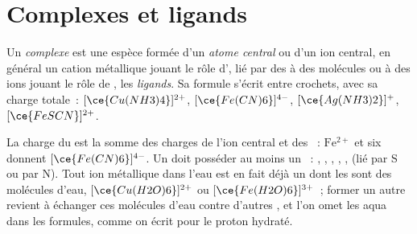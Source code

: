\section{Complexes et ligands}

\begin{definition}\label{def:b1:complexation:complex}
Un \emph{complexe} est une espèce formée d'un \emph{atome
central} ou d'un ion central, en général un cation
métallique jouant le rôle d', lié par des 
à des molécules ou à des ions jouant le rôle de , les
\emph{ligands}. Sa formule s'écrit entre crochets, avec sa
charge totale~: $[\ce{Cu(NH3)4}]^{2+}$,
$[\ce{Fe(CN)6}]^{4-}$, $[\ce{Ag(NH3)2}]^{+}$, $[\ce{FeSCN}]^{2+}$.
\end{definition}

La charge du  est la somme des charges de l'ion central et des
~: $\mathrm{Fe^{2+}}$ et six  donnent
$[\ce{Fe(CN)6}]^{4-}$. Un  doit posséder au moins un ~: , , , , ,  (lié
par S ou par N). Tout ion métallique dans l'eau est en fait déjà un
 dont les  sont des molécules d'eau,
$[\ce{Cu(H2O)6}]^{2+}$ ou $[\ce{Fe(H2O)6}]^{3+}$~; former un autre
 revient à échanger ces molécules d'eau contre d'autres ,
et l'on omet les  aqua dans les formules, comme on écrit 
pour le proton hydraté.

